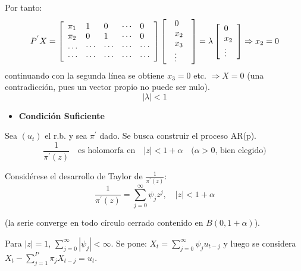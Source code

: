 Por tanto:
\[
P^{'}X=\left[ {{\begin{array}{*{20}c}
 {\pi_{1} } \hfill & 1 \hfill & 0 \hfill & \cdots \hfill & 0 \hfill \\
 {\pi_{2} } \hfill & 0 \hfill & 1 \hfill & \cdots \hfill & 0 \hfill \\
 \mathellipsis \hfill & \cdots \hfill & \cdots \hfill & \cdots \hfill & 
\cdots \hfill \\
 \cdots \hfill & \cdots \hfill & \cdots \hfill & \cdots \hfill & \cdots 
\hfill \\
\end{array} }} \right]\left[ {{\begin{array}{*{20}c}
 {\begin{array}{l}
 0 \\ 
 x_{2} \\ 
 x_{3} \\ 
 \vdots \\ 
 \end{array}} \hfill \\
\end{array} }} \right]=\lambda \left[ {\begin{array}{l}
 0 \\ 
 x_{2} \\ 
 \vdots \\ 
 \end{array}} \right]\Rightarrow x_{2} =0
\]
continuando con la segunda l\'{i}nea se obtiene $x_{3}=0$ etc. $\Rightarrow X=0$ (una contradicci\'{o}n, pues un vector propio no puede ser nulo).
\[
\left| \lambda \right|<1
\]

\begin{itemize}
      \item \textbf{Condici\'{o}n Suficiente}
\end{itemize}

Sea $\left( {u_{t} } \right)$ el r.b. y sea $\pi^{'}$ dado. Se busca construir el proceso AR(p).
\[
\frac{1}{\pi^{'}(z)} \quad\text{es holomorfa en}\quad |z|<1+\alpha \quad\text{($\alpha>0$, bien elegido)}
\]

Consid\'{e}rese el desarrollo de Taylor de $\frac{1}{\pi^{'}(z)}$:
\[
\frac{1}{\pi^{'}(z)}=\sum_{j=0}^{\infty} \psi_{j}z^{j},\quad \left| z \right|<1+\alpha 
\]

(la serie converge en todo c\'{i}rculo cerrado contenido en $B(0,1+\alpha)$).\newline

Para $|z|=1$, $\sum_{j=0}^{\infty} \left| \psi_{j} \right|<\infty$. Se pone: $X_{t} =\sum_{j=0}^{\infty} \psi_{j} u_{t-j}$ y luego se considera $X_{t} -\sum_{j=1}^P \pi_{j} X_{t-j} =u_{t}$.\newline

